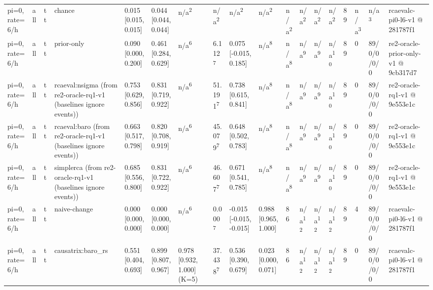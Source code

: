 \begin{table}[t]
\begin{tabular}{llllllllllllllllll}
pi=0, rate=6/h & all & tt & chance & 0.015 [0.015, 0.015] & 0.044 [0.044, 0.044] & n/a\textsuperscript{2} & n/a\textsuperscript{2} & n/a\textsuperscript{2} & n/a\textsuperscript{2} & n/a\textsuperscript{2} & n/a\textsuperscript{2} & n/a\textsuperscript{2} & n/a\textsuperscript{2} & 89 & n/a\textsuperscript{3} & n/a\textsuperscript{3} & rcaevalc-pi0-l6-v1 @ 281787f1 \\
pi=0, rate=6/h & all & tt & prior-only & 0.090 [0.000, 0.200] & 0.461 [0.284, 0.629] & n/a\textsuperscript{6} & 6.112\textsuperscript{7} & 0.075 [-0.015, 0.185] & n/a\textsuperscript{8} & n/a\textsuperscript{8} & n/a\textsuperscript{9} & n/a\textsuperscript{9} & n/a\textsuperscript{10} & 89 & 0 & 89/0/0/0/0 & re2-oracle-prior-only-v1 @ 9cb317d7 \\
pi=0, rate=6/h & all & tt & rcaeval:nsigma (from re2-oracle-rq1-v1 (baselines ignore events)) & 0.753 [0.629, 0.856] & 0.831 [0.719, 0.922] & n/a\textsuperscript{6} & 51.191\textsuperscript{7} & 0.738 [0.615, 0.841] & n/a\textsuperscript{8} & n/a\textsuperscript{8} & n/a\textsuperscript{9} & n/a\textsuperscript{9} & n/a\textsuperscript{10} & 89 & 0 & 89/0/0/0/0 & re2-oracle-rq1-v1 @ 9e553e1c \\
pi=0, rate=6/h & all & tt & rcaeval:baro (from re2-oracle-rq1-v1 (baselines ignore events)) & 0.663 [0.517, 0.798] & 0.820 [0.708, 0.919] & n/a\textsuperscript{6} & 45.079\textsuperscript{7} & 0.648 [0.502, 0.783] & n/a\textsuperscript{8} & n/a\textsuperscript{8} & n/a\textsuperscript{9} & n/a\textsuperscript{9} & n/a\textsuperscript{10} & 89 & 0 & 89/0/0/0/0 & re2-oracle-rq1-v1 @ 9e553e1c \\
pi=0, rate=6/h & all & tt & simplerca (from re2-oracle-rq1-v1 (baselines ignore events)) & 0.685 [0.556, 0.800] & 0.831 [0.722, 0.922] & n/a\textsuperscript{6} & 46.607\textsuperscript{7} & 0.671 [0.541, 0.785] & n/a\textsuperscript{8} & n/a\textsuperscript{8} & n/a\textsuperscript{9} & n/a\textsuperscript{9} & n/a\textsuperscript{10} & 89 & 0 & 89/0/0/0/0 & re2-oracle-rq1-v1 @ 9e553e1c \\
pi=0, rate=6/h & all & tt & naive-change & 0.000 [0.000, 0.000] & 0.000 [0.000, 0.000] & n/a\textsuperscript{6} & 0.000\textsuperscript{7} & -0.015 [-0.015, -0.015] & 0.988 [0.965, 1.000] & 86 & n/a\textsuperscript{12} & n/a\textsuperscript{12} & n/a\textsuperscript{12} & 89 & 4 & 89/0/0/0/0 & rcaevalc-pi0-l6-v1 @ 281787f1 \\
pi=0, rate=6/h & all & tt & causatrix:baro\_rs & 0.551 [0.404, 0.693] & 0.899 [0.807, 0.967] & 0.978 [0.932, 1.000] (K=5) & 37.438\textsuperscript{7} & 0.536 [0.390, 0.679] & 0.023 [0.000, 0.071] & 86 & n/a\textsuperscript{12} & n/a\textsuperscript{12} & n/a\textsuperscript{12} & 89 & 0 & 89/0/0/0/0 & rcaevalc-pi0-l6-v1 @ 281787f1 \\

\end{tabular}
\end{table}
